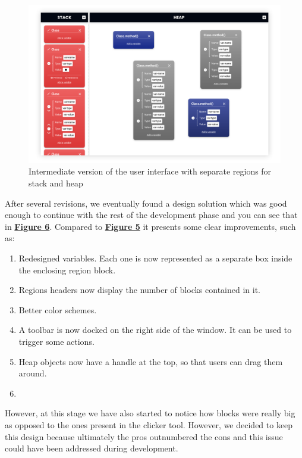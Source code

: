 \documentclass[]{usiinfbachelorproject}
\begin{document}
\begin{figure}[h!]
\centering
\includegraphics[width=\textwidth]{figures/separate_regions.png}
\caption {Intermediate version of the user interface with separate regions for stack and heap}
\label{separate regions}
\end{figure}

\noindent After several revisions, we eventually found a design solution which was good enough to continue with the rest of the development phase and you can see that in \hyperref[final ui]{\textbf{Figure 6}}. Compared to \hyperref[separate regions]{\textbf{Figure 5}} it presents some clear improvements, such as:

\begin{enumerate}
	\item Redesigned variables. Each one is now represented as a separate box inside the enclosing region block.
	\item Regions headers now display the number of blocks contained in it.
	\item Better color schemes.
	\item A toolbar is now docked on the right side of the window. It can be used to trigger some actions.
	\item Heap objects now have a handle at the top, so that users can drag them around.
	\item 
\end{enumerate}

\noindent However, at this stage we have also started to notice how blocks were really big as opposed to the ones present in the clicker tool. However, we decided to keep this design because ultimately the pros outnumbered the cons and this issue could have been addressed during development.
\end{document}
